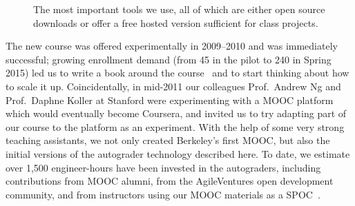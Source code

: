 \begin{figure}
  
  \caption{\label{fig:tools} The most important tools we use, all of
    which are either open source downloads or offer a free
hosted version sufficient for class projects.}
\end{figure}



The new course was offered experimentally in 2009--2010 and was
immediately successful; growing enrollment demand (from 45 in the pilot
to 240 in Spring 2015) led 
us to write a book around the course~\cite{esaaS} and to start thinking
about how to scale it up.  
Coincidentally, in mid-2011 our colleagues Prof.~Andrew Ng
and Prof.~Daphne Koller at Stanford were experimenting with a MOOC
platform which would eventually become Coursera, and invited us to try
adapting part of our course to the
platform as an experiment.  With the help of some very strong teaching
assistants, we not only created Berkeley's first MOOC, but also the
initial versions of the autograder technology described here.  To date,
we estimate over 1,500 engineer-hours have been invested in the
autograders, including contributions from MOOC alumni,
from the AgileVentures  open development community,
and from
instructors using our MOOC materials as a SPOC~\cite{moocs-spocs-TR}.

